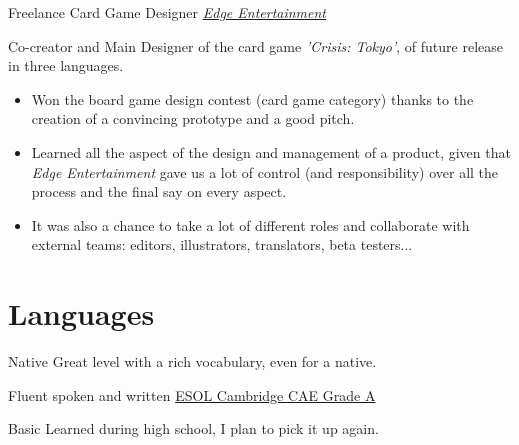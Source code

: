 \documentclass[11pt,a4paper,roman]{moderncv}
\begin{document}
	{Freelance Card Game Designer}
	{ \textit{\href{http://edgeent.com}{Edge Entertainment}}}
	{}
	{}
	{Co-creator and Main Designer of the card game \textit{'Crisis: Tokyo'}, of future release in 
	three languages.
\begin{itemize}
	\item Won the board game design contest (card game category) thanks to the 
	creation of a convincing prototype and a good pitch.
	\item Learned all the aspect of the design and management of a product, given 
	that \textit{Edge Entertainment} gave us a lot of control (and responsibility) 
	over all the process and the final say on every aspect.
	\item It was also a chance to take a lot of different roles and collaborate 
	with external teams: editors, illustrators, translators, beta testers...
\end{itemize}}





\section{Languages}
	{Native}
	{Great level with a rich vocabulary, even for a native.}

	{Fluent spoken and written}
	{\href{https://dl.dropbox.com/u/87894135/StatementOfResult.pdf}
	{ESOL Cambridge CAE Grade A}}

	{Basic}
	{Learned during high school, I plan to pick it up again.}

\end{document}
